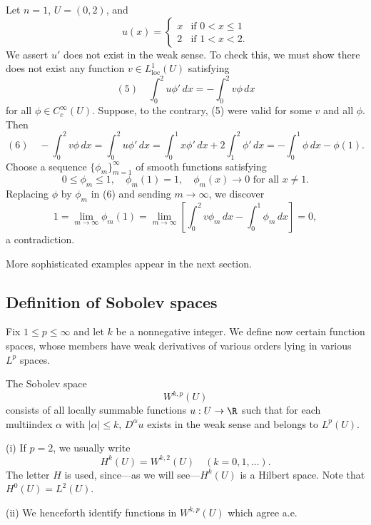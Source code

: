 \begin{example}
\label{ex:weak-derivative-nonexistence-example}
Let $n = 1$, $U = (0,2)$, and
$$u(x) = \begin{cases} x & \text{if } 0 < x \le 1 \\ 2 & \text{if } 1 < x < 2. \end{cases}$$
We assert $u'$ does not exist in the weak sense. To check this, we must show there does not exist any function $v \in L^1_{\text{loc}}(U)$ satisfying
$$(5) \quad \int_0^2 u\phi' \, dx = -\int_0^2 v\phi \, dx$$
for all $\phi \in C_c^\infty(U)$. Suppose, to the contrary, (5) were valid for some $v$ and all $\phi$. Then
$$(6) \quad -\int_0^2 v\phi \, dx = \int_0^2 u\phi' \, dx = \int_0^1 x\phi' \, dx + 2\int_1^2 \phi' \, dx = -\int_0^1 \phi \, dx - \phi(1).$$
Choose a sequence $\{\phi_m\}_{m=1}^\infty$ of smooth functions satisfying
$$0 \le \phi_m \le 1, \quad \phi_m(1) = 1, \quad \phi_m(x) \to 0 \text{ for all } x \ne 1.$$
Replacing $\phi$ by $\phi_m$ in (6) and sending $m \to \infty$, we discover
$$1 = \lim_{m \to \infty} \phi_m(1) = \lim_{m \to \infty} \left[\int_0^2 v\phi_m \, dx - \int_0^1 \phi_m \, dx\right] = 0,$$
a contradiction.
\end{example}

More sophisticated examples appear in the next section.

\subsection{Definition of Sobolev spaces}

Fix $1 \le p \le \infty$ and let $k$ be a nonnegative integer. We define now certain function spaces, whose members have weak derivatives of various orders lying in various $L^p$ spaces.

\begin{definition}
\label{def:sobolev-space-wkp}
The Sobolev space
$$W^{k,p}(U)$$
consists of all locally summable functions $u : U \to \R$ such that for each multiindex $\alpha$ with $|\alpha| \le k$, $D^\alpha u$ exists in the weak sense and belongs to $L^p(U)$.
\end{definition}

\begin{remark}
\label{rem:hk-notation-identification}
(i) If $p = 2$, we usually write
$$H^k(U) = W^{k,2}(U) \quad (k = 0, 1, \ldots).$$
The letter $H$ is used, since---as we will see---$H^k(U)$ is a Hilbert space. Note that $H^0(U) = L^2(U)$.

(ii) We henceforth identify functions in $W^{k,p}(U)$ which agree a.e.
\end{remark}

